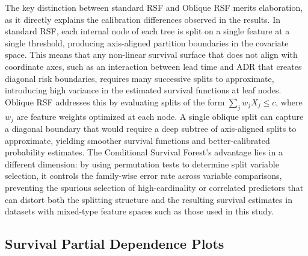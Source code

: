 \documentclass[pdflatex,iicol,sn-mathphys-ay]{sn-jnl}
\theoremstyle{thmstyleone}%
\theoremstyle{thmstyletwo}%
\theoremstyle{thmstylethree}%
\begin{document}
The key distinction between standard RSF and Oblique RSF merits elaboration, as it directly explains the calibration differences observed in the results. In standard RSF, each internal node of each tree is split on a single feature at a single threshold, producing axis-aligned partition boundaries in the covariate space. This means that any non-linear survival surface that does not align with coordinate axes, such as an interaction between lead time and ADR that creates diagonal risk boundaries, requires many successive splits to approximate, introducing high variance in the estimated survival functions at leaf nodes. Oblique RSF addresses this by evaluating splits of the form $\sum_j w_j X_j \leq c$, where $w_j$ are feature weights optimized at each node. A single oblique split can capture a diagonal boundary that would require a deep subtree of axis-aligned splits to approximate, yielding smoother survival functions and better-calibrated probability estimates. The Conditional Survival Forest's advantage lies in a different dimension: by using permutation tests to determine split variable selection, it controls the family-wise error rate across variable comparisons, preventing the spurious selection of high-cardinality or correlated predictors that can distort both the splitting structure and the resulting survival estimates in datasets with mixed-type feature spaces such as those used in this study.

\subsection{Survival Partial Dependence Plots}
\end{document}

